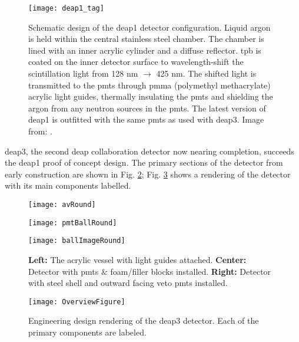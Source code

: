 \begin{figure}[ht]
\centering
\texttt{[image: deap1\_tag]}
\caption{Schematic design of the \gls{deap1} detector configuration. Liquid argon is held within the central stainless steel chamber.  The chamber is lined with an inner acrylic cylinder and a diffuse reflector. \gls{tpb} is coated on the inner detector surface to wavelength-shift the scintillation light from 128 nm $\rightarrow$ 425 nm. The shifted light is transmitted to the \gls{pmt}s through \gls{pmma} (polymethyl methacrylate) acrylic light guides, thermally insulating the \gls{pmt}s and shielding the argon from any neutron sources in the \gls{pmt}s. The latest version of \gls{deap1} is outfitted with the same \gls{pmt}s as used with \gls{deap3}. Image from: \cite{2009DEAP1}.}
\label{Fig:deap1Rendering}
\end{figure}

\gls{deap3}, the second \gls{deap} collaboration detector now nearing completion, succeeds the \gls{deap1} proof of concept design. The primary sections of the detector from early construction are shown in Fig. \ref{Fig:detectorBalls}; Fig. \ref{Fig:deap3Rendering} shows a rendering of the detector with its main components labelled.


\begin{figure}[ht]
\centering
\begin{minipage}{0.31\textwidth}
\texttt{[image: avRound]}

\end{minipage}
\begin{minipage}{0.31\textwidth}
\texttt{[image: pmtBallRound]}

\end{minipage}
\begin{minipage}{0.31\textwidth}
\texttt{[image: ballImageRound]}

\end{minipage}
\caption{\textbf{Left:} The acrylic vessel with light guides attached. \textbf{Center:} Detector with \gls{pmt}s $\&$ foam/filler blocks installed. \textbf{Right:} Detector with steel shell and outward facing veto \gls{pmt}s installed.}
\label{Fig:detectorBalls}
\end{figure}


\begin{figure}[ht]
\centering
\texttt{[image: OverviewFigure]}
\caption{Engineering design rendering of the \gls{deap3} detector. Each of the primary components are labeled.}
\label{Fig:deap3Rendering}
\end{figure}


